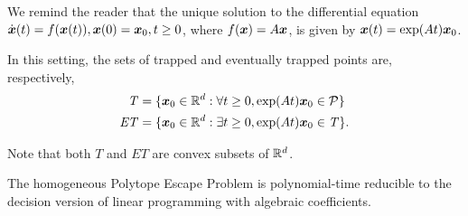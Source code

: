 We remind the reader that the unique solution to the differential equation $\dot{\boldsymbol{x}}(t)=f(\boldsymbol{x}(t)),\boldsymbol{x}(0)=\boldsymbol{x}_{0},t\geq 0$, where $f(\boldsymbol{x})=A\boldsymbol{x}$, is given by
$\boldsymbol{x}(t)=\exp(At)\boldsymbol{x}_{0}$.

In this setting, the sets of trapped and eventually trapped points are, respectively,
\begin{align*}
\mathit{T}&=\lbrace \boldsymbol{x}_0\in\mathbb{R}^{d}: \forall t\geq 0, \exp(At)\boldsymbol{x}_{0} \in \mathcal{P}\rbrace \\
\mathit{ET}&=\lbrace \boldsymbol{x}_{0}\in\mathbb{R}^{d}:\exists t\geq 0,\exp(At)\boldsymbol{x}_{0}\in\mathit{T}\rbrace .
\end{align*}

Note that both $\mathit{T}$ and $\mathit{ET}$ are convex subsets of $\mathbb{R}^{d}$.

\begin{lemma}
  The homogeneous Polytope Escape Problem is polynomial-time
  reducible to the decision version of linear programming with
  algebraic coefficients.
\end{lemma}

